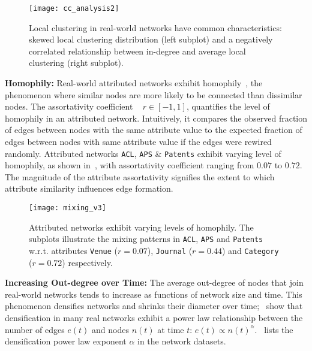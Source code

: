 
\begin{figure}
 \centering
 \texttt{[image: cc\_analysis2]}
 \caption{
    Local clustering in real-world networks have common characteristics:
    skewed local clustering distribution (left subplot) and a negatively correlated
    relationship between in-degree and average local clustering (right subplot).
 }
 \label{fig:cc_dc}
\end{figure}


\textbf{Homophily:}
Real-world attributed networks exhibit homophily~\cite{mcpherson2001birds}, the phenomenon where similar nodes are more likely
to be connected than dissimilar nodes. The assortativity coefficient
~\cite{newman2002assortative} $r \in [-1, 1]$, 
quantifies the level of homophily in an attributed network. Intuitively, it
compares the observed fraction of edges between nodes with the same attribute
value to the expected fraction of edges between nodes with same attribute value
if the edges were rewired randomly.
Attributed networks \texttt{ACL}, \texttt{APS} \& \texttt{Patents} exhibit
varying level of homophily, as shown in~, with assortativity
coefficient ranging from $0.07$ to $0.72$.
The magnitude of the attribute assortativity
signifies the extent to which attribute similarity influences edge formation.


\begin{figure}
 \centering
 \texttt{[image: mixing\_v3]}
 \caption{
    Attributed networks exhibit varying levels of homophily. The subplots
    illustrate the mixing patterns in \texttt{ACL}, \texttt{APS} and \texttt{Patents}
    w.r.t. attributes \texttt{Venue} ($r=0.07$), \texttt{Journal} ($r=0.44$) and
    \texttt{Category} ($r=0.72$) respectively.
 }
 \label{fig:mixing}
\end{figure}

\textbf{Increasing Out-degree over Time:}
The average out-degree of nodes that join real-world networks tends to increase
as functions of network size and time. This phenomenon densifies networks and shrinks their
diameter over time;~\citet{leskovec2005graphs} show that
densification in many real networks exhibit a power law relationship between the
number of edges $e(t)$ and nodes $n(t)$ at time $t$: $e(t) \propto
n(t)^{\alpha}$.~ lists the densification power law exponent $\alpha$ in
the network datasets. 

